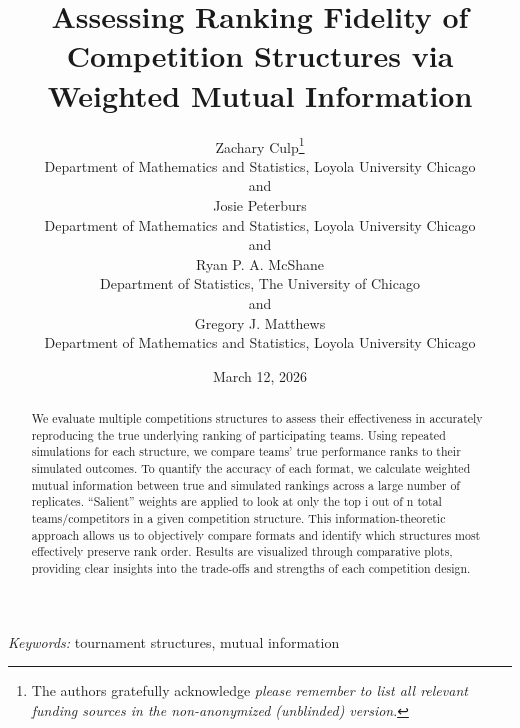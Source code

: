 \documentclass[
  12pt]{article}
\begin{document}
\def\spacingset#1{\renewcommand{\baselinestretch}%
{#1}\small\normalsize} \spacingset{1}



\date{March 12, 2026}
\title{\bf Assessing Ranking Fidelity of Competition Structures via
Weighted Mutual Information}
\author{
Zachary Culp\thanks{The authors gratefully acknowledge \emph{please
remember to list all relevant funding sources in the non-anonymized
(unblinded) version}.}\\
Department of Mathematics and Statistics, Loyola University Chicago\\
and\\Josie Peterburs\\
Department of Mathematics and Statistics, Loyola University Chicago\\
and\\Ryan P. A. McShane\\
Department of Statistics, The University of Chicago\\
and\\Gregory J. Matthews\\
Department of Mathematics and Statistics, Loyola University Chicago\\
}
\maketitle

\bigskip
\bigskip
\begin{abstract}
We evaluate multiple competitions structures to assess their
effectiveness in accurately reproducing the true underlying ranking of
participating teams. Using repeated simulations for each structure, we
compare teams' true performance ranks to their simulated outcomes. To
quantify the accuracy of each format, we calculate weighted mutual
information between true and simulated rankings across a large number of
replicates. ``Salient'' weights are applied to look at only the top i
out of n total teams/competitors in a given competition structure. This
information-theoretic approach allows us to objectively compare formats
and identify which structures most effectively preserve rank order.
Results are visualized through comparative plots, providing clear
insights into the trade-offs and strengths of each competition design.
\end{abstract}

\noindent%
{\it Keywords:} tournament structures, mutual information
\vfill
\end{document}
